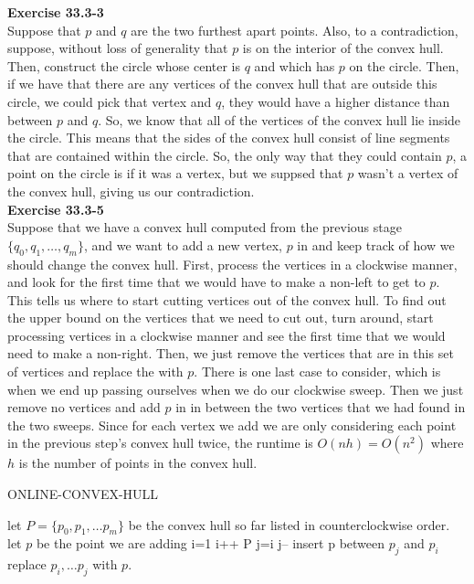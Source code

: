 \documentclass{article}
\begin{document}
\noindent\textbf{Exercise 33.3-3}\\

Suppose that $p$ and $q$ are the two furthest apart points. Also, to a contradiction, suppose, without loss of generality that $p$ is on the interior of the convex hull. Then, construct the circle whose center is $q$ and which has $p$ on the circle. Then, if we have that there are any vertices of the convex hull that are outside this circle, we could pick that vertex and $q$, they would have a higher distance than between $p$ and $q$. So, we know that all of the vertices of the convex hull lie inside the circle. This means that the sides of the convex hull consist of line segments that are contained within the circle. So, the only way that they could contain $p$, a point on the circle is if it was a vertex, but we suppsed that $p$ wasn't a vertex of the convex hull, giving us our contradiction.\\



\noindent\textbf{Exercise 33.3-5}\\

Suppose that we have a convex hull computed from the previous stage $\{q_0,q_1,\ldots, q_m\}$, and we want to add a new vertex, $p$  in and keep track of how we should change the convex hull. First, process the vertices in a clockwise manner, and look for the first time that we would have to make a non-left to get to $p$. This tells us where to start cutting vertices out of the convex hull. To find out the upper bound on the vertices that we need to cut out, turn around, start processing vertices in a clockwise manner and see the first time that we would need to make a non-right. Then, we just remove the vertices that are in this set of vertices and replace the with $p$. There is one last case to consider, which is when we end up passing ourselves when we do our clockwise sweep. Then we just remove no vertices and add $p$ in in between the two vertices that we had found in the two sweeps. Since for each vertex we add we are only considering each point in the previous step's convex hull twice, the runtime is $O(nh) = O(n^2)$ where $h$ is the number of points in the convex hull.\\

\begin{algorithm}
\caption{ONLINE-CONVEX-HULL}
\begin{algorithmic}
\State let $P =\{p_0,p_1,\ldots p_m\}$ be the convex hull so far listed in counterclockwise order.
\State let $p$ be the point we are adding
\State i=1
\State i++
\EndWhile
{}
\State \Return P
\EndIf
\State j=i
\State j--
\EndWhile
{}
\State insert p between $p_j$ and $p_i$
\Else
\State replace $p_i, \ldots p_j$ with $p$.
\EndIf
\end{algorithmic}
\end{algorithm}
\end{document}
